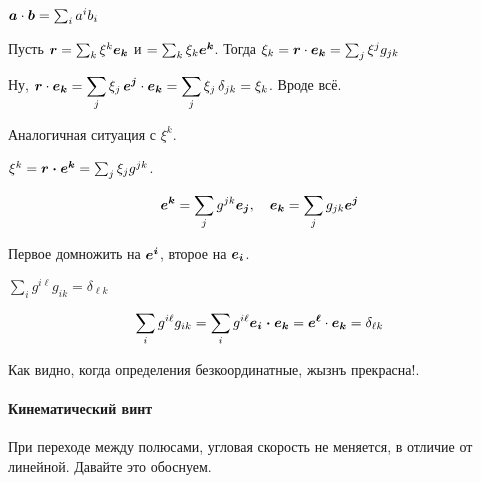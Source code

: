 \documentclass[ebook]{longnotes}
\begin{document}
\begin{prop}
  $\v a\cdot \v b = \sum_i a^i b_i$
\end{prop}

\begin{prop}
  Пусть $\v r = \sum_k \xi^k \v {e_k}$ и $=\sum_k\xi_k \v{e^k}$.
  Тогда $\xi_k = \v r \cdot \v{e_k} = \sum_j \xi^j g_{jk}$
\end{prop}
\begin{lproof}
  Ну, $\v{r} \cdot \v{e_k} = \dsum_j \xi_j \, \v{e^j}\cdot \v{e_k} 
  = \sum_j \xi_j \,\delta_{jk} = \xi_k$. Вроде всё.
\end{lproof}

Аналогичная ситуация с $\xi^k$.
\begin{prop}
  $\xi^k = \v{r\cdot e^k} = \sum_j \xi_j g^{jk}$.
\end{prop}

\begin{prop}
\[
  \v{e^k} = \sum_j g^{jk} \v{e_j}, \quad \v{e_k} = \sum_j g_{jk} \v{e^j}
\]
\begin{lproof}
  Первое домножить на $\v{e^i}$, второе на $\v{e_i}$.
\end{lproof}
\end{prop}
\begin{prop}
  $\sum_{i} g^{i\ell}g_{ik} = \delta_{\ell k}$
\end{prop}
\begin{lproof}
  \[
    \sum_{i} g^{i\ell}g_{ik} = \sum_i g^{i\ell} \v{e_i \cdot e_k} = \v{e^\ell}\cdot \v{e_k} =
    \delta_{\ell k}
  \]  
\end{lproof}


Как видно, когда определения безкоординатные, жызнъ прекрасна!. 
\setcounter{paragraph}{12}
\paragraph{Кинематический винт}

При переходе между полюсами, угловая скорость не меняется, в отличие от линейной.
Давайте это обоснуем.
\end{document}

